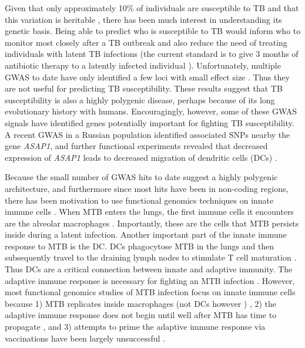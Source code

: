 Given that only approximately 10\% of individuals are susceptible to
TB and that this variation is heritable \citep{Kallmann1943, Comstock1978, Cobat2010, Moller2010},
there has been much interest in understanding its genetic
basis. Being able to predict who is susceptible to TB would inform who
to monitor most closely after a TB outbreak and also reduce the need
of treating individuals with latent TB infections (the current
standard is to give 3 months of antibiotic therapy to a latently
infected individual \citep{Munoz2015}). Unfortunately, multiple GWAS to date have only
identified a few loci with small effect size
\citep{Thye2010, Mahasirimongkol2012, Thye2012, Png2012, Chimusa2014, Curtis2015, Sobota2016}.
Thus they are not useful
for predicting TB susceptibility. These results suggest that TB
susceptibility is also a highly polygenic disease, perhaps because of
its long evolutionary history with humans. Encouragingly, however, some
of these GWAS signals have identified genes potentially important for
fighting TB susceptibility. A recent GWAS in a Russian population
identified associated SNPs nearby the gene \emph{ASAP1}, and further
functional experiments revealed that decreased expression of
\emph{ASAP1} leads to decreased migration of dendritic cells (DCs)
\citep{Curtis2015}.

Because the small number of GWAS hits to date suggest a highly
polygenic architecture, and furthermore since most hits have been in
non-coding regions, there has been motivation to use functional
genomics techniques on innate immune cells \citep{Thuong2008, Barreiro2012, Pacis2015}.
When MTB enters the lungs,
the first immune cells it encounters are the alveolar
macrophages \citep{Tailleux2008, Ernst2012, Sia2015}. Importantly, these are the cells that MTB persists inside
during a latent infection. Another important part of the innate immune
response to MTB is the DC. DCs phagocytose MTB in the lungs and then
subsequently travel to the draining lymph nodes to stimulate T cell
maturation \citep{Tailleux2008, Ernst2012, Sia2015}. Thus DCs are a critical connection between innate and
adaptive immunity. The adaptive immune response is necessary for
fighting an MTB infection \citep{Flynn1992}. However, most functional genomics studies
of MTB infection focus on innate immune cells because 1) 
MTB replicates inside macrophages \citep{Sia2015} (not DCs however \citep{Tailleux2003}) , 2) the adaptive immune response does
not begin until well after MTB has time to propagate \citep{Khan2016}, and 3) attempts
to prime the adaptive immune response via vaccinations have been
largely unsuccessful \citep{Wang2013}.

